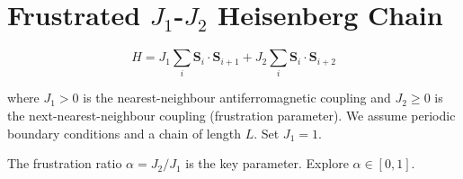 \documentclass{article}
\begin{document}
\section*{Frustrated $J_1$-$J_2$ Heisenberg Chain}

\begin{equation}
H = J_1 \sum_{i} \mathbf{S}_i \cdot \mathbf{S}_{i+1}
  + J_2 \sum_{i} \mathbf{S}_i \cdot \mathbf{S}_{i+2}
\end{equation}

where $J_1 > 0$ is the nearest-neighbour antiferromagnetic coupling and
$J_2 \geq 0$ is the next-nearest-neighbour coupling (frustration parameter).
We assume periodic boundary conditions and a chain of length $L$.
Set $J_1 = 1$.

The frustration ratio $\alpha = J_2/J_1$ is the key parameter.
Explore $\alpha \in [0, 1]$.
\end{document}
